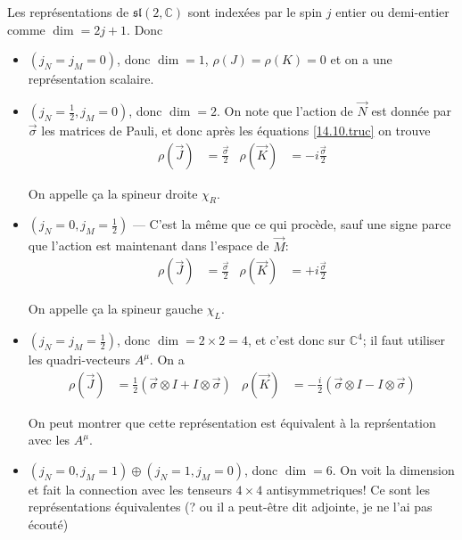 \documentclass[10pt]{report}
\begin{document}
Les repr\'esentations de $\mathfrak{sl}(2,\mathbb{C})$ sont index\'ees par le spin $j$ entier ou demi-entier comme $\dim = 2j + 1$. Donc
\begin{itemize}
    \item $(j_N = j_M = 0)$, donc $\dim = 1$, $\rho(J) = \rho(K) = 0$ et on a une repr\'esentation scalaire.
    \item $\left(j_N = \frac{1}{2}, j_M = 0\right)$, donc $\dim = 2$. On note que l'action de $\vec{N}$ est donn\'ee par $\vec{\sigma}$ les matrices de Pauli, et donc apr\`es les \'equations \eqref{14.10.truc} on trouve
        \begin{align}
            \rho\left( \vec{J} \right) &= \frac{\vec{\sigma}}{2} & \rho\left( \vec{K} \right) &= -i\frac{\vec{\sigma}}{2}
        \end{align}

        On appelle \c{c}a la spineur droite $\chi_R$.
    \item $\left(j_N = 0, j_M = \frac{1}{2}\right)$ --- C'est la m\^eme que ce qui proc\`ede, sauf une signe parce que l'action est maintenant dans l'espace de $\vec{M}$:
        \begin{align}
            \rho\left( \vec{J} \right) &= \frac{\vec{\sigma}}{2} & \rho\left( \vec{K} \right) &= +i\frac{\vec{\sigma}}{2}
        \end{align}

        On appelle \c{c}a la spineur gauche $\chi_L$.
    \item $\left( j_N = j_M = \frac{1}{2} \right)$, donc $\dim = 2 \times 2 = 4$, et c'est donc sur $\mathbb{C}^{4}$; il faut utiliser les quadri-vecteurs $A^\mu$. On a
        \begin{align}
            \rho(\vec{J}) &= \frac{1}{2}\left( \vec{\sigma} \otimes I + I\otimes \vec{\sigma} \right) &
            \rho(\vec{K}) &= -\frac{i}{2}\left( \vec{\sigma} \otimes I - I\otimes \vec{\sigma} \right) 
        \end{align}

        On peut montrer que cette repr\'esentation est \'equivalent \`a la repr\'sentation avec les $A^\mu$. 

    \item $\left( j_N = 0, j_M = 1 \right) \oplus \left( j_N = 1, j_M = 0 \right)$, donc $\dim = 6$. On voit la dimension et fait la connection avec les tenseurs $4 \times 4$ antisymmetriques! Ce sont les repr\'esentations \'equivalentes (? ou il a peut-\^etre dit adjointe, je ne l'ai pas \'ecout\'e)
\end{itemize}
\end{document}
